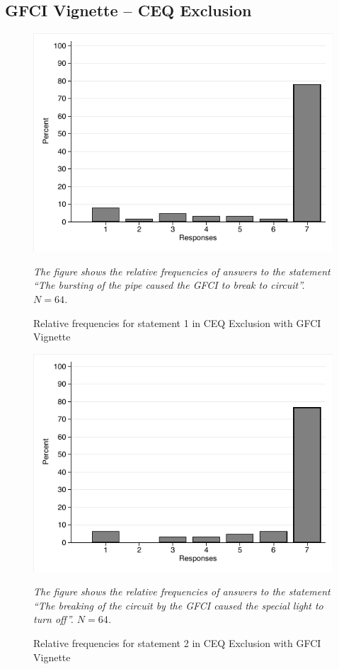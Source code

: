 \documentclass[egregdoesnotlikesansseriftitles,12pt]{scrartcl}
\begin{document}
\subsection{GFCI Vignette -- CEQ Exclusion}
\begin{figure}[H]
   \centering
   \includegraphics[scale=0.8]{figures/cir_ceq_hist_1.pdf}
   \begin{minipage}{0.9\linewidth}
   \footnotesize
   \emph{The figure shows the relative frequencies of answers to the statement ``The bursting of the pipe caused the GFCI to break to circuit''. $N=64$.}
   \end{minipage}
   \caption{Relative frequencies for statement 1 in CEQ Exclusion with GFCI Vignette}
   \label{fig:cir_ceq_hist_1}
\end{figure}

\begin{figure}[H]
   \centering
   \includegraphics[scale=0.8]{figures/cir_ceq_hist_2.pdf}
   \begin{minipage}{0.9\linewidth}
   \footnotesize
   \emph{The figure shows the relative frequencies of answers to the statement ``The breaking of the circuit by the GFCI caused the special light to turn off''. $N=64$.}
   \end{minipage}
   \caption{Relative frequencies for statement 2 in CEQ Exclusion with GFCI Vignette}
   \label{fig:cir_ceq_hist_2}
\end{figure}
\end{document}
